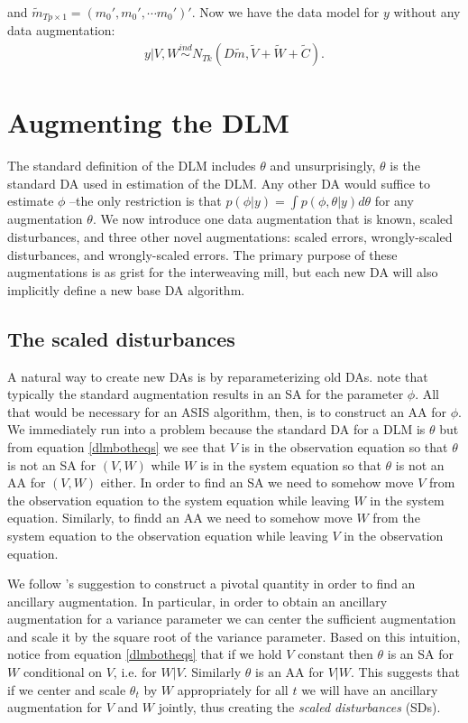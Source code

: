 \documentclass[12pt]{article}
\begin{document}
and $\tilde{m}_{Tp\times 1} = (m_0', m_0', \cdots m_0')'$. Now we have the data model for $y$ without any data augmentation:
\begin{align}
  y|V,W \stackrel{ind}{\sim} N_{Tk}(D\tilde{m}, \tilde{V} + \tilde{W} + \tilde{C}). \label{margmodel}
\end{align}

\section{Augmenting the DLM}\label{sec:DAs}

The standard definition of the DLM includes $\theta$ and unsurprisingly, $\theta$ is the standard DA used in estimation of the DLM. Any other DA would suffice to estimate $\phi$ --the only restriction is that $p(\phi|y) = \int p(\phi,\theta|y)d\theta$ for any augmentation $\theta$. We now introduce one data augmentation that is known, scaled disturbances, and three other novel augmentations: scaled errors, wrongly-scaled disturbances, and wrongly-scaled errors. The primary purpose of these augmentations is as grist for the interweaving mill, but each new DA will also implicitly define a new base DA algorithm.

\subsection{The scaled disturbances}\label{sec:DAs:dist}

A natural way to create new DAs is by reparameterizing old DAs. \citet{papaspiliopoulos2007general} note that typically the standard augmentation results in an SA for the parameter $\phi$. All that would be necessary for an ASIS algorithm, then, is to construct an AA for $\phi$. We immediately run into a problem because the standard DA for a DLM is $\theta$ but from equation \eqref{dlmbotheqs} we see that $V$ is in the observation equation so that $\theta$ is not an SA for $(V,W)$ while $W$ is in the system equation so that $\theta$ is not an AA for $(V,W)$ either. In order to find an SA we need to somehow move $V$ from the observation equation to the system equation while leaving $W$ in the system equation. Similarly, to findd an AA we need to somehow move $W$ from the system equation to the observation equation while leaving $V$ in the observation equation.

We follow \citet{papaspiliopoulos2007general}'s suggestion to construct a pivotal quantity in order to find an ancillary augmentation. In particular, in order to obtain an ancillary augmentation for a variance parameter we can center the sufficient augmentation and scale it by the square root of the variance parameter. Based on this intuition, notice from equation \eqref{dlmbotheqs} that if we hold $V$ constant then $\theta$ is an SA for $W$ conditional on $V$, i.e. for $W|V$. Similarly $\theta$ is an AA for $V|W$. This suggests that if we center and scale $\theta_{t}$ by $W$ appropriately for all $t$ we will have an ancillary augmentation for $V$ and $W$ jointly, thus creating the {\it scaled disturbances} (SDs).
\end{document}
